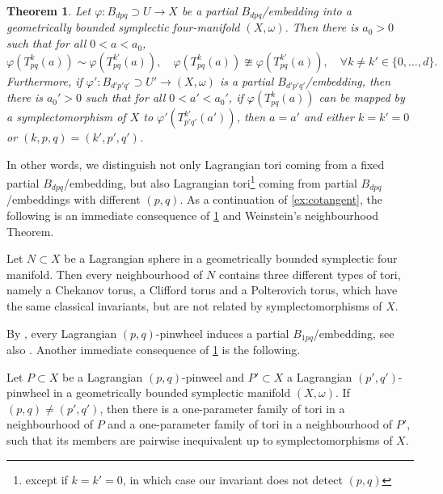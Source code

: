 \documentclass[AIF,Unicode,manuscript]{cedram}
\newtheorem{maintheorem}{Theorem}
\begin{document}
\begin{maintheorem}
    \label{thm:B}
    Let $\varphi \colon B_{dpq} \supset U \rightarrow X$ be a partial $B_{dpq}$\-/embedding into a geometrically bounded symplectic four-manifold $(X,\omega)$.
Then there is $a_0 > 0$ such that for all $0 < a < a_0$, 
    \begin{equation}
        \varphi(T^k_{pq}(a)) \sim \varphi(T^{k'}_{pq}(a)), \quad 
        \varphi(T^k_{pq}(a)) \ncong \varphi(T^{k'}_{pq}(a)), \quad
        \forall k \neq k' \in \{0,\ldots,d\}.
    \end{equation}
    Furthermore, if $\varphi' \colon B_{d'p'q'} \supset U' \rightarrow (X,\omega)$ is a partial $B_{d'p'q'}$\-/embedding, then there is $a_0' > 0$ such that for all $0<a' < a_0'$, if $\varphi(T^k_{pq}(a))$ can be mapped by a symplectomorphism of $X$ to $\varphi'(T^{k'}_{p'q'}(a'))$, then $a=a'$ and either $k = k' = 0$ or $(k,p,q) = (k',p',q')$. 
\end{maintheorem}

In other words, we distinguish not only Lagrangian tori coming from a fixed partial $B_{dpq}$\-/embedding, but also Lagrangian tori\footnote{except if $k=k'=0$, in which case our invariant does not detect $(p,q)$} coming from partial $B_{dpq}$\-/embeddings with different $(p,q)$.
As a continuation of \cref{ex:cotangent}, the following is an immediate consequence of \cref{thm:B} and Weinstein's neighbourhood Theorem.

\begin{corollary}
    \label{thm:lag_sphere}
    Let $N \subset X$ be a Lagrangian sphere in a geometrically bounded symplectic four manifold.
    Then every neighbourhood of $N$ contains three different types of tori, namely a Chekanov torus, a Clifford torus and a Polterovich torus, which have the same classical invariants, but are not related by symplectomorphisms of $X$.
\end{corollary}

By \cite{Kho13}, every Lagrangian $(p,q)$-pinwheel induces a partial $B_{1pq}$\-/embedding, see also \cite[Definition 2.10]{EvaSmi18}.
Another immediate consequence of \cref{thm:B} is the following.

\begin{corollary}
    \label{thm:pinwheels}
    Let $P \subset X$ be a Lagrangian $(p,q)$-pinweel and $P' \subset X$ a Lagrangian $(p',q')$-pinwheel in a geometrically bounded symplectic manifold $(X,\omega)$.
    If $(p,q) ≠ (p',q')$, then there is a one-parameter family of tori in a neighbourhood of $P$ and a one-parameter family of tori in a neighbourhood of $P'$, such that its members are pairwise inequivalent up to symplectomorphisms of $X$.
\end{corollary}
\end{document}
